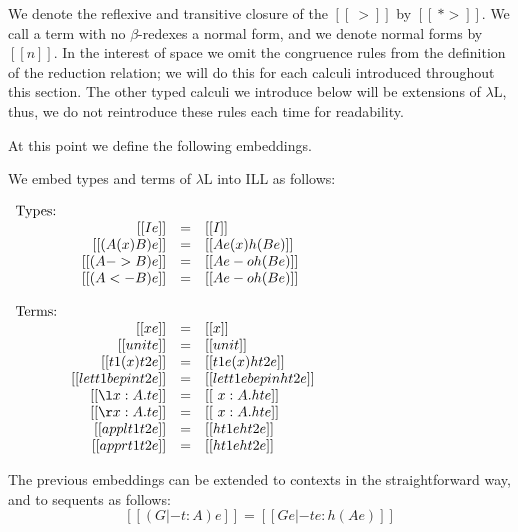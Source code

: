 \documentclass{llncs}
\begin{document}
We denote the reflexive and transitive closure of the $[[~>]]$ by
$[[~*>]]$.  We call a term with no $\beta$-redexes a normal form,
and we denote normal forms by $[[n]]$.  In the interest of space we
omit the congruence rules from the definition of the reduction
relation; we will do this for each calculi introduced throughout this
section.  The other typed calculi we introduce below will be
extensions of $\lambda\text{L}$, thus, we do not reintroduce these
rules each time for readability.

At this point we define the following embeddings.
\begin{definition}
  \label{def:lambda-L_to_ILL}
  We embed types and terms of $\lambda\text{L}$ into ILL as follows:
  \begin{center}
    \begin{math}
      \begin{array}{lrllllllllllllllllll}
        \text{Types:}\\
        & [[I e]] & = & [[I]]\\
        & [[(A (x) B) e]] & = & [[A e (x) h(B e)]]\\
        & [[(A -> B) e]] & = & [[A e -o h(B e)]]\\
        & [[(A <- B) e]] & = & [[A e -o h(B e)]]\\                    
        \\
        \text{Terms:}\\
        & [[x e]] & = & [[x]]\\
        & [[unit e]] & = & [[unit]]\\
        & [[{t1 (x) t2} e]] & = & [[t1 e (x) h{t2 e}]]\\
        & [[{let t1 be p in t2} e]] & = & [[let t1 e be p in h{t2 e}]]\\
        & [[{\l x : A.t} e]] & = & [[\ x : A.h{t e}]]\\
        & [[{\r x : A.t} e]] & = & [[\ x : A.h{t e}]]\\
        & [[{appl t1 t2} e]] & = & [[h{t1 e} h{t2 e}]]\\
        & [[{appr t1 t2} e]] & = & [[h{t1 e} h{t2 e}]]\\
      \end{array}
    \end{math}
  \end{center}
  The previous embeddings can be extended to contexts in the
  straightforward way, and to sequents as follows:
  \[ [[(G |- t : A) e]] = [[G e |- t e : h(A e)]]\]
\end{definition}
\end{document}
